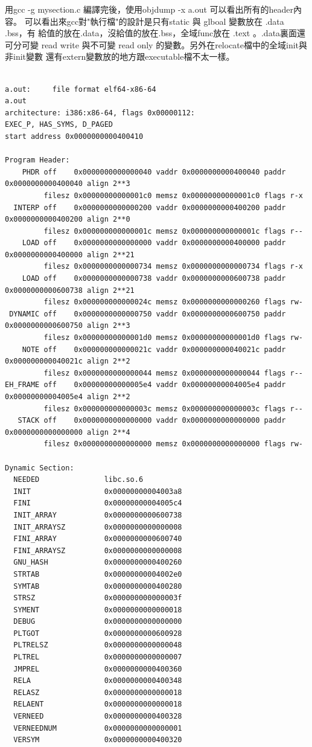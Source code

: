   用gcc -g mysection.c 編譯完後，使用objdump -x a.out 可以看出所有的header內容。
  可以看出來gcc對"執行檔"的設計是只有static 與 glboal 變數放在 .data .bss，有
  給值的放在.data，沒給值的放在.bss，全域func放在 .text 。.data裏面還可分可變
  read write 與不可變 read only 的變數。另外在relocate檔中的全域init與非init變數
  還有extern變數放的地方跟executable檔不太一樣。
  \begin{verbatim}

a.out:     file format elf64-x86-64
a.out
architecture: i386:x86-64, flags 0x00000112:
EXEC_P, HAS_SYMS, D_PAGED
start address 0x0000000000400410

Program Header:
    PHDR off    0x0000000000000040 vaddr 0x0000000000400040 paddr 0x0000000000400040 align 2**3
         filesz 0x00000000000001c0 memsz 0x00000000000001c0 flags r-x
  INTERP off    0x0000000000000200 vaddr 0x0000000000400200 paddr 0x0000000000400200 align 2**0
         filesz 0x000000000000001c memsz 0x000000000000001c flags r--
    LOAD off    0x0000000000000000 vaddr 0x0000000000400000 paddr 0x0000000000400000 align 2**21
         filesz 0x0000000000000734 memsz 0x0000000000000734 flags r-x
    LOAD off    0x0000000000000738 vaddr 0x0000000000600738 paddr 0x0000000000600738 align 2**21
         filesz 0x000000000000024c memsz 0x0000000000000260 flags rw-
 DYNAMIC off    0x0000000000000750 vaddr 0x0000000000600750 paddr 0x0000000000600750 align 2**3
         filesz 0x00000000000001d0 memsz 0x00000000000001d0 flags rw-
    NOTE off    0x000000000000021c vaddr 0x000000000040021c paddr 0x000000000040021c align 2**2
         filesz 0x0000000000000044 memsz 0x0000000000000044 flags r--
EH_FRAME off    0x00000000000005e4 vaddr 0x00000000004005e4 paddr 0x00000000004005e4 align 2**2
         filesz 0x000000000000003c memsz 0x000000000000003c flags r--
   STACK off    0x0000000000000000 vaddr 0x0000000000000000 paddr 0x0000000000000000 align 2**4
         filesz 0x0000000000000000 memsz 0x0000000000000000 flags rw-

Dynamic Section:
  NEEDED               libc.so.6
  INIT                 0x00000000004003a8
  FINI                 0x00000000004005c4
  INIT_ARRAY           0x0000000000600738
  INIT_ARRAYSZ         0x0000000000000008
  FINI_ARRAY           0x0000000000600740
  FINI_ARRAYSZ         0x0000000000000008
  GNU_HASH             0x0000000000400260
  STRTAB               0x00000000004002e0
  SYMTAB               0x0000000000400280
  STRSZ                0x000000000000003f
  SYMENT               0x0000000000000018
  DEBUG                0x0000000000000000
  PLTGOT               0x0000000000600928
  PLTRELSZ             0x0000000000000048
  PLTREL               0x0000000000000007
  JMPREL               0x0000000000400360
  RELA                 0x0000000000400348
  RELASZ               0x0000000000000018
  RELAENT              0x0000000000000018
  VERNEED              0x0000000000400328
  VERNEEDNUM           0x0000000000000001
  VERSYM               0x0000000000400320


\end{verbatim}
